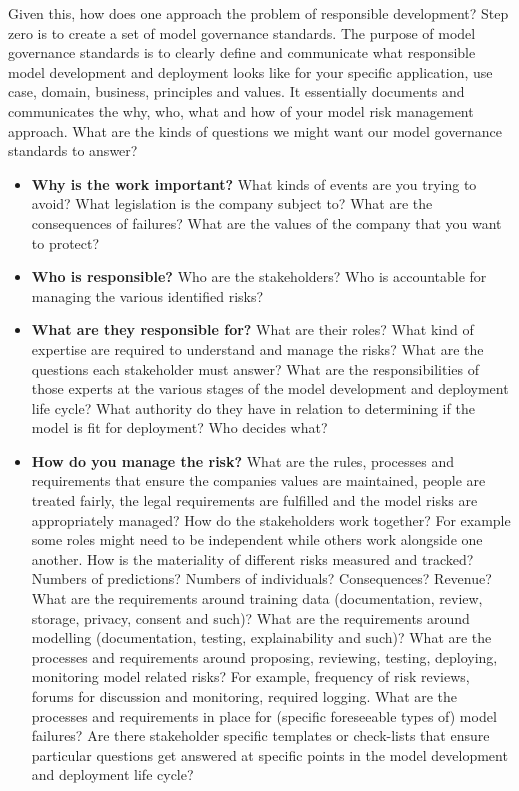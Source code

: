 Given this, how does one approach the problem of responsible development? Step zero is to create a set of model governance standards. The purpose of model governance standards is to clearly define and communicate what responsible model development and deployment looks like for your specific application, use case, domain, business, principles and values. It essentially documents and communicates the why, who, what and how of your model risk management approach. What are the kinds of questions we might want our model governance standards to answer?
%
\begin{itemize}[leftmargin=*]
\item \textbf{Why is the work important?} What kinds of events are you trying to avoid? What legislation is the company subject to? What are the consequences of failures? What are the values of the company that you want to protect?
%
\item \textbf{Who is responsible?} Who are the stakeholders? Who is accountable for managing the various identified risks?
%
\item \textbf{What are they responsible for?} What are their roles? What kind of expertise are required to understand and manage the risks? What are the questions each stakeholder must answer? What are the responsibilities of those experts at the various stages of the model development and deployment life cycle? What authority do they have in relation to determining if the model is fit for deployment? Who decides what?
%
\item \textbf{How do you manage the risk?} What are the rules, processes and requirements that ensure the companies values are maintained, people are treated fairly, the legal requirements are fulfilled and the model risks are appropriately managed? How do the stakeholders work together? For example some roles might need to be independent while others work alongside one another. How is the materiality of different risks measured and tracked? Numbers of predictions? Numbers of individuals? Consequences? Revenue? What are the requirements around training data (documentation, review, storage, privacy, consent and such)? What are the requirements around modelling (documentation, testing, explainability and such)? What are the processes and requirements around proposing, reviewing, testing, deploying, monitoring model related risks? For example, frequency of risk reviews, forums for discussion and monitoring, required logging. What are the processes and requirements in place for (specific foreseeable types of) model failures? Are there stakeholder specific templates or check-lists that ensure particular questions get answered at specific points in the model development and deployment life cycle?
\end{itemize}

